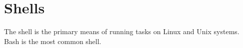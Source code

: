 \section{Shells}
The shell is the primary means of running tasks on Linux and Unix systems.
Bash is the most common shell.


